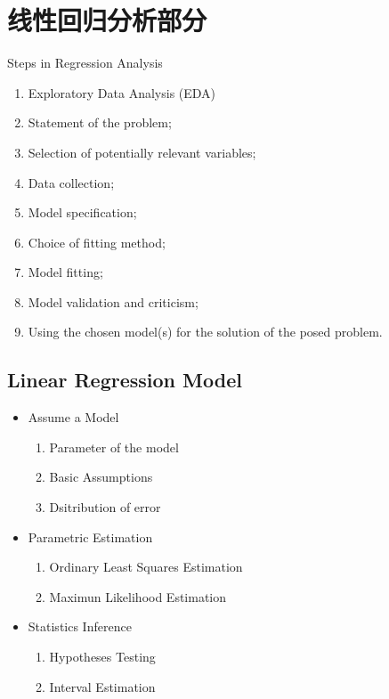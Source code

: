 \section{线性回归分析部分}\label{SecLinearRegressionAnalysis}
\begin{point}
    Steps in Regression Analysis
\end{point}

\begin{enumerate}[topsep=2pt,itemsep=2pt]
    \item Exploratory Data Analysis (EDA)
    \item Statement of the problem;
    \item Selection of potentially relevant variables;
    \item Data collection;
    \item Model specification;
    \item Choice of fitting method;
    \item Model fitting;
    \item Model validation and criticism;
    \item Using the chosen model(s) for the solution of the posed problem.
\end{enumerate}

    

\subsection{Linear Regression Model}
\begin{itemize}[topsep=6pt,itemsep=4pt]
    \item Assume a Model
    \begin{enumerate}[topsep=6pt,itemsep=4pt]
        \item Parameter of the model
        \item Basic Assumptions
        \item Dsitribution of error
    \end{enumerate}
    \item Parametric Estimation
    \begin{enumerate}[topsep=6pt,itemsep=4pt]
        \item Ordinary Least Squares Estimation
        \item Maximun Likelihood Estimation
    \end{enumerate}
    \item Statistics Inference
    \begin{enumerate}[topsep=6pt,itemsep=4pt]
        \item Hypotheses Testing
        \item Interval Estimation
    \end{enumerate}

\end{itemize}


